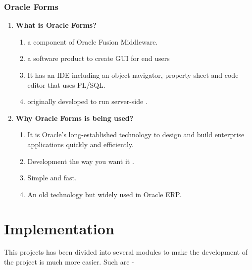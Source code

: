 \documentclass[12pt]{report} %
\begin{document}
\subsection*{Oracle Forms} 
\renewcommand{\labelenumi}{\alph{enumi})}
\begin{enumerate}
		\item \textbf{What is Oracle Forms?}
		\begin{enumerate}
			\item a component of Oracle Fusion Middleware.
			\item a software product to create GUI for end users
			\item It has an IDE including an object navigator, property sheet and code editor that uses PL/SQL.
			\item originally developed to run server-side .

		\end{enumerate}
		
		\item \textbf{Why Oracle Forms is being used?}
		\begin{enumerate}
			\item It is Oracle's long-established technology to design and build enterprise applications quickly and efficiently.
			\item Development the way you want it .
			\item Simple and fast.
			\item An old technology but widely used in Oracle ERP. 

		\end{enumerate}
\end{enumerate}

\clearpage









\chapter{Implementation}
\setcounter{page}{1}
\thispagestyle{empty}    %
This projects has been divided into several modules to make the development of the project is much more easier. Such are -  
\end{document}
